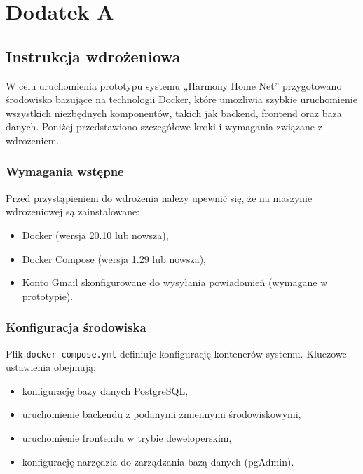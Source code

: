 \chapter{Dodatek A}

\section{Instrukcja wdrożeniowa}

W celu uruchomienia prototypu systemu „Harmony Home Net” przygotowano środowisko bazujące na technologii Docker, które umożliwia szybkie uruchomienie wszystkich niezbędnych komponentów, takich jak backend, frontend oraz baza danych. Poniżej przedstawiono szczegółowe kroki i wymagania związane z wdrożeniem.

\subsection{Wymagania wstępne}

Przed przystąpieniem do wdrożenia należy upewnić się, że na maszynie wdrożeniowej są zainstalowane:
\begin{itemize}
    \item Docker (wersja 20.10 lub nowsza),
    \item Docker Compose (wersja 1.29 lub nowsza),
    \item Konto Gmail skonfigurowane do wysyłania powiadomień (wymagane w prototypie).
\end{itemize}

\subsection{Konfiguracja środowiska}

Plik \texttt{docker-compose.yml} definiuje konfigurację kontenerów systemu. Kluczowe ustawienia obejmują:
\begin{itemize}
    \item konfigurację bazy danych PostgreSQL,
    \item uruchomienie backendu z podanymi zmiennymi środowiskowymi,
    \item uruchomienie frontendu w trybie deweloperskim,
    \item konfigurację narzędzia do zarządzania bazą danych (pgAdmin).
\end{itemize}

